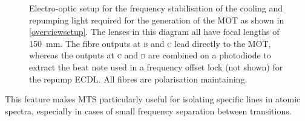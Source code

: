 \documentclass[../Thesis-IJspeert.tex]{subfiles}
\begin{document}
\begin{figure}[t]
	\caption[Electro-optical setup for the frequency stabilisation of the cooling and repumping light]{Electro-optic setup for the frequency stabilisation of the cooling and repumping light required for the generation of the MOT as shown in \autoref{overviewsetup}. The lenses in this diagram all have focal lengths of \SI{150}{\milli\meter}. The fibre outputs at \textsc{b} and \textsc{c} lead directly to the MOT, whereas the outputs at \textsc{c} and \textsc{d} are combined on a photodiode to extract the beat note used in a frequency offset lock (not shown) for the repump ECDL. All fibres are polarisation maintaining.}
	\label{lockingsetup} 
\end{figure}
This feature makes MTS particularly useful for isolating specific lines in atomic spectra, especially in cases of small frequency separation between transitions.
\end{document}

